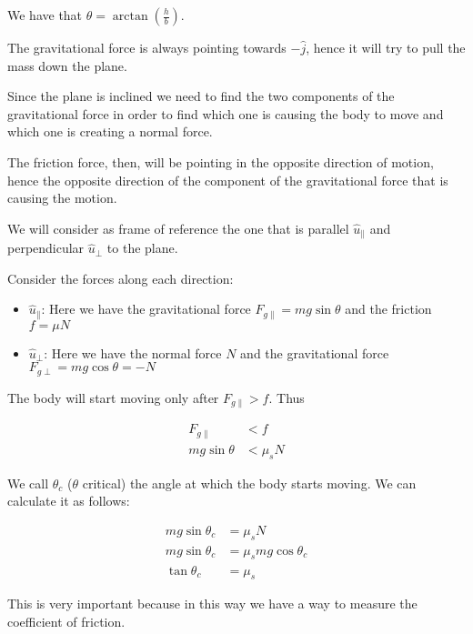 \documentclass[14pt]{extarticle}
\begin{document}
We have that $\theta = \arctan\left(\frac{h}{b}\right)$.

The gravitational force is always pointing towards $-\hat j$, hence it will try to pull the mass down the plane.

Since the plane is inclined we need to find the two components of the gravitational force in order to find which one is causing the body to move and which one is creating a normal force.

The friction force, then, will be pointing in the opposite direction of motion, hence the opposite direction of the component of the gravitational force that is causing the motion.

We will consider as frame of reference the one that is parallel $\hat u_{\parallel}$ and perpendicular $\hat u_{\perp}$ to the plane.

Consider the forces along each direction:

\begin{itemize}
  \item $\hat u_{\parallel}$:
        Here we have the gravitational force $F_{g\parallel} = mg \sin \theta$ and the friction $f = \mu N$
  \item $\hat u_{\perp}$: Here we have the normal force $N$ and the gravitational force $F_{g\perp} = mg \cos \theta = - N$
\end{itemize}

The body will start moving only after $F_{g\parallel} > f$. Thus

\begin{align*}
  F_{g\parallel} & < f       \\
  mg \sin \theta & < \mu_s N
\end{align*}

We call $\theta_c$ ($\theta$ critical) the angle at which the body starts moving. We can calculate it as follows:

\begin{align*}
  mg \sin \theta_c & = \mu_s N                \\
  mg \sin \theta_c & = \mu_s mg \cos \theta_c \\
  \tan \theta_c    & = \mu_s
\end{align*}

This is very important because in this way we have a way to measure the coefficient of friction.
\end{document}
